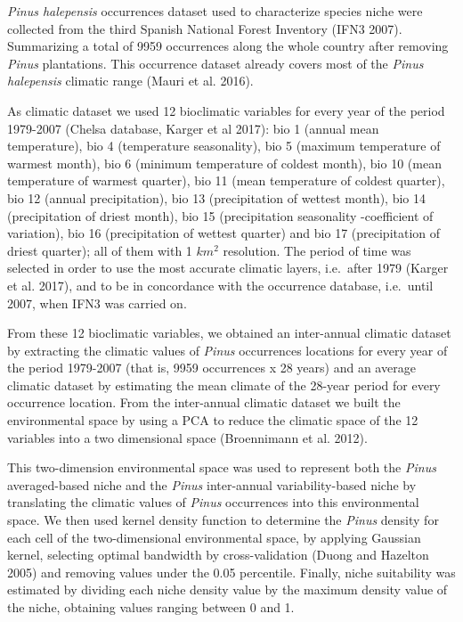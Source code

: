 \documentclass[11pt,twoside]{reedthesis}
\begin{document}
\emph{Pinus halepensis} occurrences dataset used to characterize species
niche were collected from the third Spanish National Forest Inventory
(IFN3 2007). Summarizing a total of 9959 occurrences along the whole
country after removing \emph{Pinus} plantations. This occurrence dataset
already covers most of the \emph{Pinus halepensis} climatic range (Mauri
et al. 2016).\par
\setlength{\parindent}{30pt} As climatic dataset we used 12 bioclimatic
variables for every year of the period 1979-2007 (Chelsa database,
Karger et al 2017): bio 1 (annual mean temperature), bio 4 (temperature
seasonality), bio 5 (maximum temperature of warmest month), bio 6
(minimum temperature of coldest month), bio 10 (mean temperature of
warmest quarter), bio 11 (mean temperature of coldest quarter), bio 12
(annual precipitation), bio 13 (precipitation of wettest month), bio 14
(precipitation of driest month), bio 15 (precipitation seasonality
-coefficient of variation), bio 16 (precipitation of wettest quarter)
and bio 17 (precipitation of driest quarter); all of them with 1
\(km^2\) resolution. The period of time was selected in order to use the
most accurate climatic layers, i.e.~after 1979 (Karger et al. 2017), and
to be in concordance with the occurrence database, i.e.~until 2007, when
IFN3 was carried on.\par

From these 12 bioclimatic variables, we obtained an inter-annual
climatic dataset by extracting the climatic values of \emph{Pinus}
occurrences locations for every year of the period 1979-2007 (that is,
9959 occurrences x 28 years) and an average climatic dataset by
estimating the mean climate of the 28-year period for every occurrence
location. From the inter-annual climatic dataset we built the
environmental space by using a PCA to reduce the climatic space of the
12 variables into a two dimensional space (Broennimann et al. 2012).\par

This two-dimension environmental space was used to represent both the
\emph{Pinus} averaged-based niche and the \emph{Pinus} inter-annual
variability-based niche by translating the climatic values of
\emph{Pinus} occurrences into this environmental space. We then used
kernel density function to determine the \emph{Pinus} density for each
cell of the two-dimensional environmental space, by applying Gaussian
kernel, selecting optimal bandwidth by cross-validation (Duong and
Hazelton 2005) and removing values under the 0.05 percentile. Finally,
niche suitability was estimated by dividing each niche density value by
the maximum density value of the niche, obtaining values ranging between
0 and 1.\par
\end{document}
